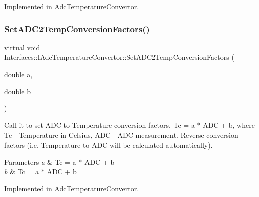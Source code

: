 Implemented in \hyperlink{class_adc_temperature_convertor_aa6935469c6bb9e2df9a21495d7e8b72a}{Adc\+Temperature\+Convertor}.

\mbox{\label{class_interfaces_1_1_i_adc_temperature_convertor_a3e4c9204b3593bc434a041c7a69c430f}} 
\subsubsection{\texorpdfstring{Set\+A\+D\+C2\+Temp\+Conversion\+Factors()}{SetADC2TempConversionFactors()}}
{\footnotesize\ttfamily virtual void Interfaces\+::\+I\+Adc\+Temperature\+Convertor\+::\+Set\+A\+D\+C2\+Temp\+Conversion\+Factors (\begin{DoxyParamCaption}\item[{double}]{a,  }\item[{double}]{b }\end{DoxyParamCaption})\hspace{0.3cm}{\ttfamily [pure virtual]}}



Call it to set A\+DC to Temperature conversion factors. Tc = a $\ast$ A\+DC + b, where Tc -\/ Temperature in Celsius, A\+DC -\/ A\+DC measurement. Reverse conversion factors (i.\+e. Temperature to A\+DC will be calculated automatically). 


\begin{DoxyParams}{Parameters}
{\em a} & Tc = a $\ast$ A\+DC + b \\
\hline
{\em b} & Tc = a $\ast$ A\+DC + b \\
\hline
\end{DoxyParams}


Implemented in \hyperlink{class_adc_temperature_convertor_a5a19355f805554763e914e5b2216d5f6}{Adc\+Temperature\+Convertor}.

\mbox{\label{class_interfaces_1_1_i_adc_temperature_convertor_a65bbef2300e21c495d95305921ddb74b}} 
